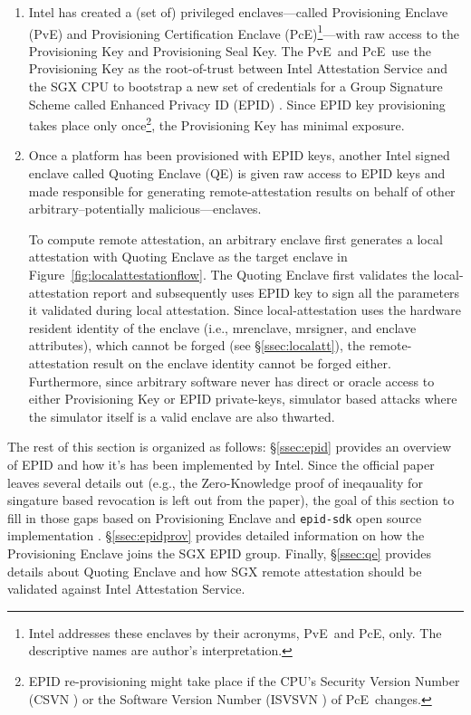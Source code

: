 \documentclass[10pt, letterpaper]{article}
\newcommand{\secref}[1]{\S\ref{#1}}
\newcommand{\mrenclave}{\textsf{mrenclave}}
\newcommand{\mrsigner}{\textsf{mrsigner}}
\newcommand{\pve}{\textsf{PvE}}
\newcommand{\pce}{\textsf{PcE}}
\newcommand{\qe}{\textsf{QE}}
\begin{document}
  \begin{enumerate}
    \item Intel has created a (set of) privileged enclaves---called
      \textsf{Provisioning Enclave} (\pve) and \textsf{Provisioning
        Certification Enclave} (\pce)\footnote{Intel addresses these
        enclaves by their acronyms, \pve\ and \pce, only. The
        descriptive names are author's interpretation.}---with raw
      access to the Provisioning Key and Provisioning Seal Key. The
      \pve\ and \pce\ use the Provisioning Key as the root-of-trust
      between Intel Attestation Service and the SGX CPU to bootstrap a
      new set of credentials for a Group Signature Scheme called
      Enhanced Privacy ID (EPID) \cite{epid}. Since EPID key
      provisioning takes place only once\footnote{EPID re-provisioning
        might take place if the CPU's Security Version Number (CSVN
        \cite[\S39.4.2.2]{intelsdm}) or the Software Version Number
        (ISVSVN \cite[\S39.4.2.1]{intelsdm}) of \pce\ changes.}, the
      Provisioning Key has minimal exposure.

    \item Once a platform has been provisioned with EPID keys, another
      Intel signed enclave called \textsf{Quoting Enclave} (\qe) is
      given raw access to EPID keys and made responsible for
      generating remote-attestation results on behalf of other
      arbitrary--potentially malicious---enclaves.

      To compute remote attestation, an arbitrary enclave first
      generates a local attestation with \textsf{Quoting Enclave} as
      the target enclave in Figure~\ref{fig:localattestationflow}. The
      \textsf{Quoting Enclave} first validates the local-attestation
      report and subsequently uses EPID key to sign all the parameters
      it validated during local attestation. Since local-attestation
      uses the hardware resident identity of the enclave (i.e.,
      \mrenclave, \mrsigner, and enclave attributes), which cannot be
      forged (see \secref{ssec:localatt}), the remote-attestation
      result on the enclave identity cannot be forged
      either. Furthermore, since arbitrary software never has direct
      or oracle access to either Provisioning Key or EPID
      private-keys, simulator based attacks where the simulator itself
      is a valid enclave are also thwarted.
  \end{enumerate}

  The rest of this section is organized as follows: \secref{ssec:epid}
  provides an overview of EPID and how it's has been implemented by
  Intel. Since the official \cite{epid} paper leaves several details
  out (e.g., the Zero-Knowledge proof of ineqauality for singature
  based revocation is left out from the paper), the goal of this
  section to fill in those gaps based on \textsf{Provisioning Enclave}
  and \texttt{epid-sdk} open source implementation
  \cite{epidsdk}. \secref{ssec:epidprov} provides detailed information
  on how the \textsf{Provisioning Enclave} joins the SGX EPID
  group. Finally, \secref{ssec:qe} provides details about
  \textsf{Quoting Enclave} and how SGX remote attestation should be
  validated against Intel Attestation Service.
\end{document}

